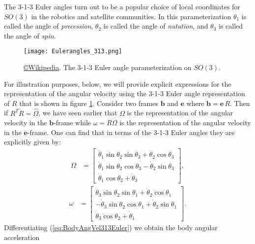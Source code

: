 \documentclass[graybox,envcountchap,sectrefs]{svmonoMuga}
\begin{document}
The 3-1-3 Euler angles turn out to be a popular choice of local coordinates for $SO(3)$ in the  robotics and satellite communities. In this parameterization $\theta_1$ is called 
the angle of \textit{precession}, $\theta_2$ is called the angle of \textit{nutation}, and $\theta_3$ is called the angle of \textit{spin}.
\begin{figure}[ht]
\begin{center}
\texttt{[image: Eulerangles\_313.png]} 
\renewcommand{\baselinestretch}{1}\selectfont
\caption{\href{https://en.wikipedia.org/wiki/Euler_angles}{\copyright Wikipedia}. The 3-1-3 Euler angle parameterization on $SO(3)$.}
\label{Fig:313Euler}
\renewcommand{\baselinestretch}{1.5}\selectfont
\end{center}
\end{figure}
For illustration purposes, below, we will provide explicit expressions for the representation of the angular velocity using the 3-1-3 Euler angle representation of $R$ that is shown in figure \ref{Fig:313Euler}. Consider two frames $\mathbf{b}$ and $\mathbf{e}$ where $\mathbf{b}=\mathbf{e}\,R$. Then if 
$R^T\dot{R}=\widehat{\Omega}$, we have seen earlier that $\Omega$ is the representation of the angular velocity in the $\mathbf{b}$-frame while $\omega=R\Omega$ is the representation of the angular velocity in the $\mathbf{e}$-frame.   One can find that in terms of the 3-1-3 Euler angles they are explicitly given by:
\begin{align}
\Omega & = 
\begin{bmatrix}
\dot{\theta}_1\sin{\theta_2}\sin{\theta_3}+\dot{\theta}_2\cos{\theta_3}\\
\dot{\theta}_1\sin{\theta_2}\cos{\theta_3}-\dot{\theta}_2\sin{\theta_3}\\ \dot{\theta}_1\cos{\theta_2}+\dot{\theta}_3
\end{bmatrix},  \label{eq:BodyAngVel313Euler}
\end{align}
\begin{align}
\omega & =
\begin{bmatrix} 
\dot{\theta}_3\sin{\theta_2}\sin{\theta_1}+\dot{\theta}_2\cos{\theta_1}\\
 -\dot{\theta}_3\sin{\theta_2}\cos{\theta_1}+\dot{\theta}_2\sin{\theta_1}\\
\dot{\theta}_3\cos{\theta_2}+\dot{\theta}_1\end{bmatrix}.  \label{eq:SpatialAngVel313Euler}
\end{align}
Differentiating (\ref{eq:BodyAngVel313Euler}) we obtain the body angular acceleration
\end{document}
